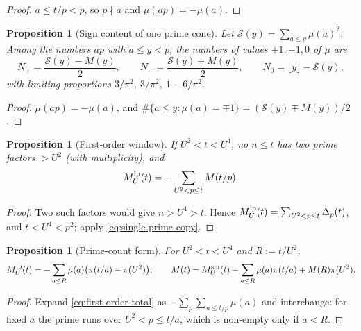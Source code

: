 \documentclass[11pt]{amsart}
\numberwithin{equation}{section}
\theoremstyle{plain}
\newtheorem{proposition}[theorem]{Proposition}
\theoremstyle{definition}
\theoremstyle{remark}
\newcommand{\Sq}{\mathcal{S}}
\begin{document}
\begin{proof}
$a\le t/p<p$, so $p\nmid a$ and $\mu(ap)=-\mu(a)$.
\end{proof}

\begin{proposition}[Sign content of one prime cone]
\label{prop:prime-cone-signs}
Let $\Sq(y)=\sum_{a\le y}\mu(a)^2$. Among the numbers $ap$ with $a\le y<p$,
the numbers of values $+1,-1,0$ of $\mu$ are
\begin{equation}
\label{eq:cone_counts}
  N_+=\frac{\Sq(y)-M(y)}{2},\qquad N_-=\frac{\Sq(y)+M(y)}{2},\qquad
  N_0=\lfloor y\rfloor-\Sq(y),
\end{equation}
with limiting proportions $3/\pi^2,\ 3/\pi^2,\ 1-6/\pi^2$.
\end{proposition}

\begin{proof}
$\mu(ap)=-\mu(a)$, and $\#\{a\le y:\mu(a)=\mp1\}=(\Sq(y)\mp M(y))/2$.
\end{proof}

\begin{proposition}[First-order window]
\label{prop:linear-new-primes}
If $U^2<t<U^4$, no $n\le t$ has two prime factors $>U^2$ (with
multiplicity), and
\begin{equation}
\label{eq:first-order-total}
  M^{\rm lp}_U(t)=-\sum_{U^2<p\le t}M(t/p).
\end{equation}
\end{proposition}

\begin{proof}
Two such factors would give $n>U^4>t$. Hence $M^{\rm lp}_U(t)=\sum_{U^2<p\le t}
\Delta_p(t)$, and $t<U^4<p^2$; apply \eqref{eq:single-prime-copy}.
\end{proof}

\begin{proposition}[Prime-count form]
\label{prop:prime_count_form}
For $U^2<t<U^4$ and $R:=t/U^2$,
\begin{equation}
\label{eq:prime_count_form}
  M^{\rm lp}_U(t)=-\sum_{a\le R}\mu(a)\bigl(\pi(t/a)-\pi(U^2)\bigr),
  \qquad
  M(t)=M^{\rm sm}_U(t)-\sum_{a\le R}\mu(a)\pi(t/a)+M(R)\pi(U^2).
\end{equation}
\end{proposition}

\begin{proof}
Expand \eqref{eq:first-order-total} as $-\sum_{p}\sum_{a\le t/p}\mu(a)$ and
interchange: for fixed $a$ the prime runs over $U^2<p\le t/a$, which is
non-empty only if $a<R$.
\end{proof}
\end{document}

